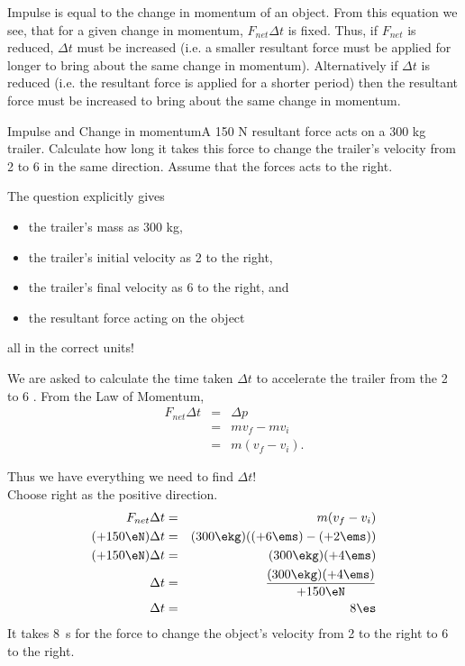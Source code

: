 Impulse is equal to the change in momentum of an object. From this equation we see, that for a given change in momentum, $F_{net}\Delta t$ is fixed. Thus, if $F_{net}$ is reduced, $\Delta t$ must be increased (i.e. a smaller resultant force must be applied for longer to bring about the same change in momentum). Alternatively if $\Delta t$ is reduced (i.e. the resultant force is applied for a shorter period) then the resultant force must be increased to bring about the same change in momentum.\\

\begin{wex}{Impulse and Change in momentum}{A 150 N resultant force acts on a 300 kg trailer. Calculate how long it takes this force to change the trailer's velocity from 2 \ms to 6 \ms in the same direction. Assume that the forces acts to the right.}
{
The question explicitly gives
\begin{itemize}
\item{the trailer's mass as 300 kg,}
\item{the trailer's initial velocity as 2 \ms to the right,}
\item{the trailer's final velocity as 6 \ms to the right, and}
\item{the resultant force acting on the object}
\end{itemize}
all in the correct units!

We are asked to calculate the time taken $\Delta t$ to accelerate the trailer from the 2 to 6 \ms. From the Law of Momentum,
\begin{eqnarray*}
{F}_{net}\Delta t &=& \Delta p \\
&=& mv_f-mv_i\\
&=& m(v_f - v_i).
\end{eqnarray*}

Thus we have everything we need to find $\Delta t$!\\

Choose right as the positive direction.\\

\begin{eqnarray*}
F_{net}\Delta t &=& m(v_f - v_i)\\
(+150 \eN)\Delta t &=& (300 \ekg)((+6 \ems)-(+2 \ems))\\
(+150 \eN)\Delta t &=& (300 \ekg)(+4 \ems)\\
\Delta t &=& \frac{(300 \ekg)(+4 \ems)}{+150 \eN}\\
\Delta t &=& 8\es
\end{eqnarray*}
It takes 8~s for the force to change the object's velocity from 2 \ms to the right to 6 \ms to the right.}
\end{wex}

